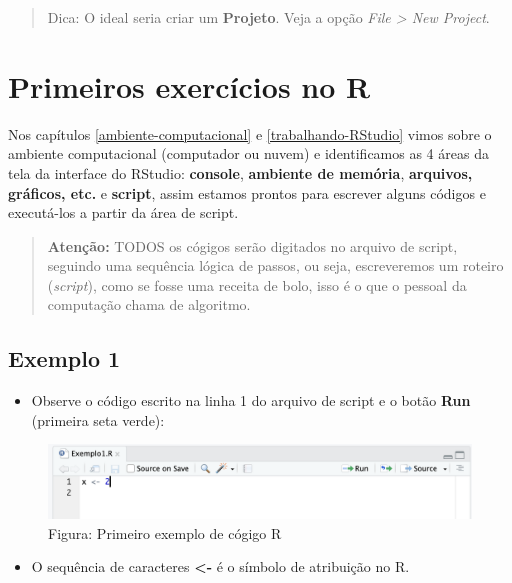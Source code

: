 \documentclass[
]{book}
\providecommand{\tightlist}{%
  \setlength{\itemsep}{0pt}\setlength{\parskip}{0pt}}
\begin{document}
\begin{quote}
Dica: O ideal seria criar um \textbf{Projeto}. Veja a opção \emph{File \textgreater{} New Project}.
\end{quote}

\chapter{Primeiros exercícios no R}\label{primeiros-exercuxedcios-no-r}

Nos capítulos \ref{ambiente-computacional} e \ref{trabalhando-RStudio} vimos sobre o ambiente computacional (computador ou nuvem) e identificamos as 4 áreas da tela da interface do RStudio: \textbf{console}, \textbf{ambiente de memória}, \textbf{arquivos, gráficos, etc.} e \textbf{script}, assim estamos prontos para escrever alguns códigos e executá-los a partir da área de script.

\begin{quote}
\textbf{Atenção:} TODOS os cógigos serão digitados no arquivo de script, seguindo uma sequência lógica de passos, ou seja, escreveremos um roteiro (\emph{script}), como se fosse uma receita de bolo, isso é o que o pessoal da computação chama de algoritmo.
\end{quote}

\section{Exemplo 1}\label{exemplo-1}

\begin{itemize}
\tightlist
\item
  Observe o código escrito na linha 1 do arquivo de script e o botão \textbf{Run} (primeira seta verde):
\end{itemize}

\begin{figure}
\centering
\includegraphics{telaExemplo1.png}
\caption{Figura: Primeiro exemplo de cógigo R}
\end{figure}

\begin{itemize}
\tightlist
\item
  O sequência de caracteres \textbf{\textless-} é o símbolo de atribuição no R.
\end{itemize}
\end{document}
